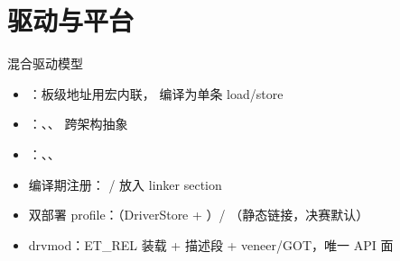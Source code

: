 \documentclass[aspectratio=1610]{beamer}
\begin{document}
\renewcommand{\azsectionsummary}{%
    混合驱动模型：零开销 MMIO + 统一 hwapi + 双部署 profile；%
    drvmod 可加载模块约 80 个导出符号唯一 API 面；下至 64 KiB SRAM 的 MCU。}
\section{驱动与平台}

\begin{frame}{混合驱动模型}
    \begin{itemize}
        \item {}：板级地址用宏内联， 编译为单条 load/store
        \item {}：、、 跨架构抽象
        \item {}：、、
        \item 编译期注册： /  放入  linker section
        \item 双部署 profile：（DriverStore + ）/ （静态链接，决赛默认）
        \item drvmod：ET\_REL 装载 +  描述段 + veneer/GOT，唯一 API 面
    \end{itemize}
    \vspace{0.3em}
\end{frame}
\end{document}
